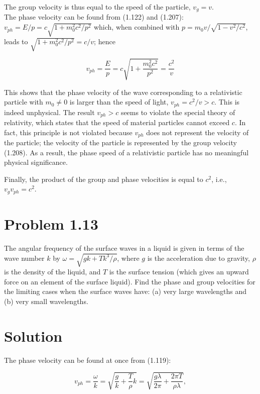 \documentclass[10pt]{article}
\begin{document}
The group velocity is thus equal to the speed of the particle, $v_{g}=v$.\\
The phase velocity can be found from (1.122) and (1.207): $v_{p h}=E / p=c \sqrt{1+m_{0}^{2} c^{2} / p^{2}}$ which, when combined with $p=m_{0} v / \sqrt{1-v^{2} / c^{2}}$, leads to $\sqrt{1+m_{0}^{2} c^{2} / p^{2}}=c / v$; hence


\begin{equation*}
v_{p h}=\frac{E}{p}=c \sqrt{1+\frac{m_{0}^{2} c^{2}}{p^{2}}}=\frac{c^{2}}{v} \tag{1.209}
\end{equation*}


This shows that the phase velocity of the wave corresponding to a relativistic particle with $m_{0} \neq 0$ is larger than the speed of light, $v_{p h}=c^{2} / v>c$. This is indeed unphysical. The result $v_{p h}>c$ seems to violate the special theory of relativity, which states that the speed of material particles cannot exceed $c$. In fact, this principle is not violated because $v_{p h}$ does not represent the velocity of the particle; the velocity of the particle is represented by the group velocity (1.208). As a result, the phase speed of a relativistic particle has no meaningful physical significance.

Finally, the product of the group and phase velocities is equal to $c^{2}$, i.e., $v_{g} v_{p h}=c^{2}$.

\section*{Problem 1.13}
The angular frequency of the surface waves in a liquid is given in terms of the wave number $k$ by $\omega=\sqrt{g k+T k^{3} / \rho}$, where $g$ is the acceleration due to gravity, $\rho$ is the density of the liquid, and $T$ is the surface tension (which gives an upward force on an element of the surface liquid). Find the phase and group velocities for the limiting cases when the surface waves have: (a) very large wavelengths and (b) very small wavelengths.

\section*{Solution}
The phase velocity can be found at once from (1.119):


\begin{equation*}
v_{p h}=\frac{\omega}{k}=\sqrt{\frac{g}{k}+\frac{T}{\rho} k}=\sqrt{\frac{g \lambda}{2 \pi}+\frac{2 \pi T}{\rho \lambda}}, \tag{1.210}
\end{equation*}
\end{document}
